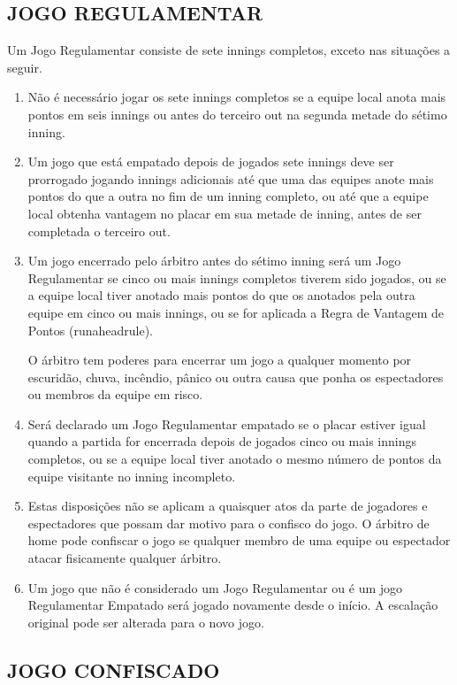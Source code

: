 \subsection{JOGO REGULAMENTAR}
  Um Jogo Regulamentar consiste de sete \glspl{inning} completos, exceto nas situações a seguir.
\begin{enumerate}[label=(\alph*)]
	\item Não é necessário jogar os sete \glspl{inning} completos se a equipe local anota mais pontos em seis \glspl{inning} ou antes do terceiro \gls{out} na segunda metade do sétimo \gls{inning}.
	\item Um jogo que está empatado depois de jogados sete \glspl{inning} deve ser prorrogado jogando \glspl{inning} adicionais até que uma das equipes anote mais pontos do que a outra no fim de um \gls{inning} completo, ou até que a equipe local obtenha vantagem no placar em sua metade de \gls{inning}, antes de ser completada o terceiro \gls{out}.
	\item Um jogo encerrado pelo árbitro antes do sétimo \gls{inning} será um Jogo Regulamentar se cinco ou mais \glspl{inning} completos tiverem sido jogados, ou se a equipe local tiver anotado mais pontos do que os anotados pela  outra equipe em cinco ou mais \glspl{inning}, ou se for aplicada a Regra de Vantagem de Pontos (\gls{runaheadrule}).

	O árbitro tem poderes para encerrar um jogo a  qualquer momento por escuridão, chuva, incêndio, pânico ou outra causa que ponha os espectadores ou membros da equipe em risco.
 	\item Será declarado um Jogo Regulamentar empatado se o placar estiver igual quando a partida for encerrada depois de jogados cinco ou mais \glspl{inning} completos, ou se a equipe local tiver anotado o mesmo número de pontos da  equipe visitante no \gls{inning} incompleto.
 	\item Estas disposições não se aplicam a quaisquer atos da parte de jogadores e espectadores que possam dar motivo para o confisco do jogo. O árbitro de \gls{home} pode confiscar o jogo se qualquer membro de uma equipe ou espectador atacar fisicamente qualquer árbitro.
	\item Um jogo que não é considerado um Jogo Regulamentar ou é um jogo Regulamentar Empatado será jogado novamente desde o início. A escalação original pode ser alterada para o novo jogo.
\end{enumerate}

\subsection{JOGO CONFISCADO}

